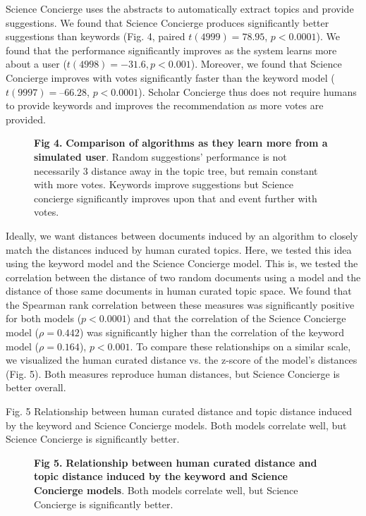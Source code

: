 \documentclass[a4paper]{article}
\begin{document}
Science Concierge uses the abstracts to automatically extract topics and provide suggestions. We found that Science Concierge produces significantly better suggestions than keywords (Fig. 4, paired $t(4999) = 78.95$, $p < 0.0001$). We found that the performance significantly improves as the system learns more about a user ($t(4998) = -31.6, p < 0.001$). Moreover, we found that Science Concierge improves with votes significantly faster than the keyword model ($t(9997) = –66.28$, $p < 0.0001$). Scholar Concierge thus does not require humans to provide keywords and improves the recommendation as more votes are provided.


\begin{figure}[!ht]
\textbf{Fig 4.} \textbf{Comparison of algorithms as they learn more from a simulated user}. Random suggestions’ performance is not necessarily 3 distance away in the topic tree, but remain constant with more votes. Keywords improve suggestions but Science concierge significantly improves upon that and event further with votes.
\end{figure}

Ideally, we want distances between documents induced by an algorithm to closely match the distances induced by human curated topics. Here, we tested this idea using the keyword model and the Science Concierge model. This is, we tested the correlation between the distance of two random documents using a model and the distance of those same documents in human curated topic space. We found that the Spearman rank correlation between these measures was significantly positive for both models ($p < 0.0001$) and that the correlation of the Science Concierge model ($\rho=0.442$) was significantly higher than the correlation of the keyword model ($\rho=0.164$), $p < 0.001$. To compare these relationships on a similar scale, we visualized the human curated distance vs. the z-score of the model’s distances (Fig. 5). Both measures reproduce human distances, but Science Concierge is better overall.

Fig. 5 Relationship between human curated distance and topic distance induced by the keyword and Science Concierge models. Both models correlate well, but Science Concierge is significantly better.

\begin{figure}[!ht]
\textbf{Fig 5.} \textbf{Relationship between human curated distance and topic distance induced by the keyword and Science Concierge models}. Both models correlate well, but Science Concierge is significantly better.
\end{figure}
\end{document}
